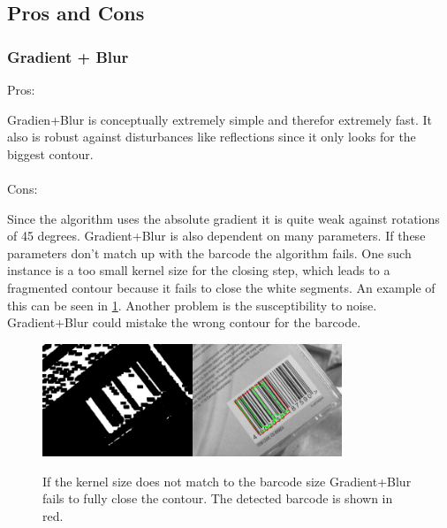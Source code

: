 \subsection{Pros and Cons}\label{sec:ProCon}
\subsubsection*{Gradient + Blur}
Pros:

Gradien+Blur is conceptually extremely simple and therefor extremely fast. It also is robust against disturbances like reflections since it only looks for the biggest contour.
\\
\\
Cons:

Since the algorithm uses the absolute gradient it is quite weak against rotations of 45 degrees. Gradient+Blur is also dependent on many parameters. If these parameters don't match up with the barcode the algorithm fails. One such instance is a too small kernel size for the closing step, which leads to a fragmented contour because it fails to close the white segments. An example of this can be seen in \cref{failgradblur}. Another problem is the susceptibility to noise. Gradient+Blur could mistake the wrong contour for the barcode.

\begin{figure}[t]
\center
\includegraphics[width=0.4\textwidth,natwidth=800,natheight=600]{img/gradientblurfail.jpg}\includegraphics[width=0.4\textwidth,natwidth=800,natheight=600]{img/gradientblurfail2.jpg}
\caption{If the kernel size does not match to the barcode size Gradient+Blur fails to fully close the contour. The detected barcode is shown in red.}
\label{failgradblur}
\end{figure}

